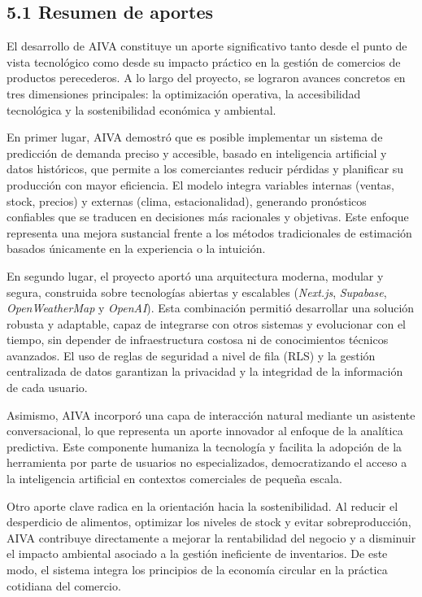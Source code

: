 \subsection*{5.1 Resumen de aportes}

El desarrollo de AIVA constituye un aporte significativo tanto desde el punto de vista tecnológico como desde su impacto práctico en la gestión de comercios de productos perecederos.  
A lo largo del proyecto, se lograron avances concretos en tres dimensiones principales: la optimización operativa, la accesibilidad tecnológica y la sostenibilidad económica y ambiental.

En primer lugar, AIVA demostró que es posible implementar un sistema de predicción de demanda preciso y accesible, basado en inteligencia artificial y datos históricos, que permite a los comerciantes reducir pérdidas y planificar su producción con mayor eficiencia.  
El modelo integra variables internas (ventas, stock, precios) y externas (clima, estacionalidad), generando pronósticos confiables que se traducen en decisiones más racionales y objetivas. Este enfoque representa una mejora sustancial frente a los métodos tradicionales de estimación basados únicamente en la experiencia o la intuición.

En segundo lugar, el proyecto aportó una arquitectura moderna, modular y segura, construida sobre tecnologías abiertas y escalables (\textit{Next.js}, \textit{Supabase}, \textit{OpenWeatherMap} y \textit{OpenAI}).  
Esta combinación permitió desarrollar una solución robusta y adaptable, capaz de integrarse con otros sistemas y evolucionar con el tiempo, sin depender de infraestructura costosa ni de conocimientos técnicos avanzados.  
El uso de reglas de seguridad a nivel de fila (RLS) y la gestión centralizada de datos garantizan la privacidad y la integridad de la información de cada usuario.

Asimismo, AIVA incorporó una capa de interacción natural mediante un asistente conversacional, lo que representa un aporte innovador al enfoque de la analítica predictiva.  
Este componente humaniza la tecnología y facilita la adopción de la herramienta por parte de usuarios no especializados, democratizando el acceso a la inteligencia artificial en contextos comerciales de pequeña escala.

Otro aporte clave radica en la orientación hacia la sostenibilidad.  
Al reducir el desperdicio de alimentos, optimizar los niveles de stock y evitar sobreproducción, AIVA contribuye directamente a mejorar la rentabilidad del negocio y a disminuir el impacto ambiental asociado a la gestión ineficiente de inventarios.  
De este modo, el sistema integra los principios de la economía circular en la práctica cotidiana del comercio.


